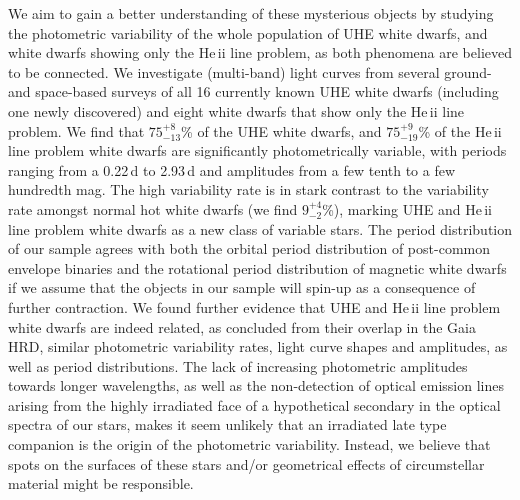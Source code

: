 \documentclass{aa}
\begin{document}
  {We aim to gain a better understanding of these mysterious objects by
    studying the photometric variability of the whole population of UHE white dwarfs, and
    white dwarfs showing only the He\,{\sc ii} line problem, as both phenomena
    are believed to be connected.}
  {We investigate (multi-band) light curves from several ground- and
    space-based surveys of all 16 currently known UHE white
   dwarfs (including one newly discovered) and eight white dwarfs that show only the He\,{\sc ii} line
   problem.}
  {We find that $75^{+8}_{-13}$\% of the UHE white dwarfs, and
    $75^{+9}_{-19}$\% of the He\,{\sc ii} line problem white dwarfs are significantly
   photometrically variable, with periods ranging from a 0.22\,d to 2.93\,d
   and amplitudes from a few tenth to a few hundredth mag. The high variability
   rate is in stark contrast to the variability rate amongst normal hot white
   dwarfs (we find $9^{+4}_{-2}$\%), marking UHE and He\,{\sc ii} line problem white
   dwarfs as a new class of variable stars. The period
   distribution of our sample agrees with both the orbital period distribution
   of post-common envelope binaries and the rotational period distribution of
   magnetic white dwarfs if we assume that the objects in our sample will
   spin-up as a consequence of further contraction.}
  {We found further evidence that UHE and He\,{\sc ii} line problem white
    dwarfs are indeed related, as concluded from their overlap in the Gaia HRD, similar
    photometric variability rates, light curve shapes and amplitudes, as well as
    period distributions.
    The lack of increasing photometric amplitudes towards longer wavelengths, as
    well as the non-detection of optical emission lines arising from the highly irradiated face of
    a hypothetical secondary in the optical spectra of our stars, makes it seem
    unlikely that an irradiated late type companion is the origin of the
  photometric variability. Instead, we believe that spots on the surfaces of these
  stars and/or geometrical effects of circumstellar material might be responsible.}
 
\end{document}
